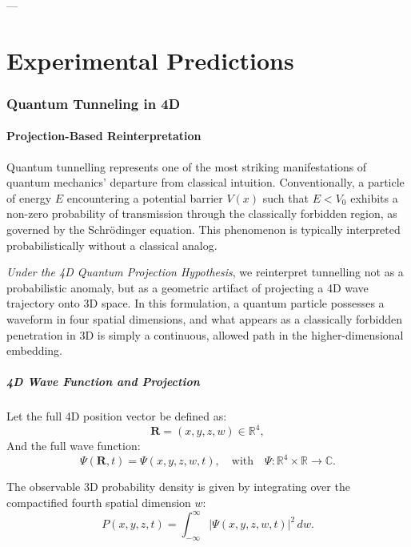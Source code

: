 \documentclass[12pt]{article}
\begin{document}
---

\part{Experimental Predictions}

\section{Quantum Tunneling in 4D}

\subsection{Projection-Based Reinterpretation}

Quantum tunnelling represents one of the most striking manifestations of quantum mechanics' departure from classical intuition. Conventionally, a particle of energy \( E \) encountering a potential barrier \( V(x) \) such that \( E < V_0 \) exhibits a non-zero probability of transmission through the classically forbidden region, as governed by the Schrödinger equation. This phenomenon is typically interpreted probabilistically without a classical analog.

\emph{Under the 4D Quantum Projection Hypothesis}, we reinterpret tunnelling not as a probabilistic anomaly, but as a geometric artifact of projecting a 4D wave trajectory onto 3D space. In this formulation, a quantum particle possesses a waveform in four spatial dimensions, and what appears as a classically forbidden penetration in 3D is simply a continuous, allowed path in the higher-dimensional embedding.

\subsubsection*{4D Wave Function and Projection}

Let the full 4D position vector be defined as:
\begin{equation}
\mathbf{R} = (x, y, z, w) \in \mathbb{R}^4,
\end{equation}
And the full wave function:
\begin{equation}
\Psi(\mathbf{R}, t) = \Psi(x, y, z, w, t), \quad \text{with} \quad \Psi : \mathbb{R}^4 \times \mathbb{R} \rightarrow \mathbb{C}.
\label{eq:wavefunction_4d}
\end{equation}

The observable 3D probability density is given by integrating over the compactified fourth spatial dimension \( w \):
\begin{equation}
P(x, y, z, t) = \int_{-\infty}^{\infty} |\Psi(x, y, z, w, t)|^2 \, dw.
\label{eq:3d_projection_density}
\end{equation}
\end{document}
